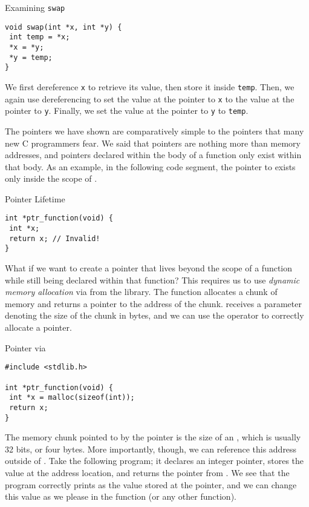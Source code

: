 \begin{cl}[main.c]{Examining \texttt{swap}}
\begin{lstlisting}[language=MyC]
void swap(int *x, int *y) {
 int temp = *x;
 *x = *y;
 *y = temp;
}
\end{lstlisting}
\end{cl}

We first dereference \texttt{x} to retrieve its value, then store it inside \texttt{temp}. Then, we again use dereferencing to set the value at the pointer to \texttt{x} to the value at the pointer to \texttt{y}. Finally, we set the value at the pointer to \texttt{y} to \texttt{temp}.

The pointers we have shown are comparatively simple to the pointers that many new C programmers fear. We said that pointers are nothing more than memory addresses, and pointers declared within the body of a function only exist within that body. As an example, in the following code segment, the pointer to  exists only inside the scope of .

\begin{cl}[main.c]{Pointer Lifetime}
\begin{lstlisting}[language=MyC]
int *ptr_function(void) {
 int *x;
 return x; // Invalid!
}
\end{lstlisting}
\end{cl}

What if we want to create a pointer that lives beyond the scope of a function while still being declared within that function? This requires us to use \textit{dynamic memory allocation} via  from the  library. The  function allocates a chunk of memory and returns a pointer to the address of the chunk.  receives a parameter denoting the size of the chunk in bytes, and we can use the  operator to correctly allocate a pointer.

\begin{cl}[main.c]{Pointer via }
\begin{lstlisting}[language=MyC]
#include <stdlib.h>

int *ptr_function(void) {
 int *x = malloc(sizeof(int));
 return x;
}
\end{lstlisting}
\end{cl}

The memory chunk pointed to by the pointer  is the size of an , which is usually 32 bits, or four bytes. More importantly, though, we can reference this address outside of . Take the following program; it declares an integer pointer, stores the value  at the address location, and returns the pointer from . We see that the program correctly prints  as the value stored at the pointer, and we can change this value as we please in the  function (or any other function).

